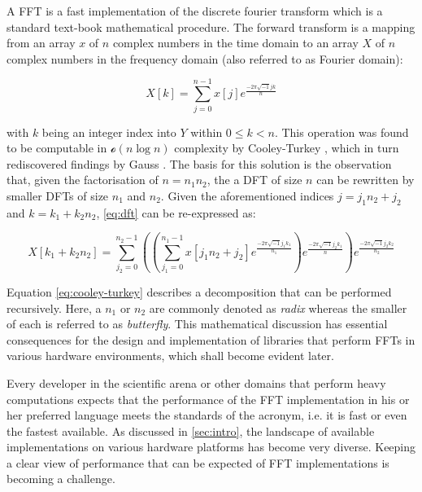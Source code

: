A FFT is a fast implementation of the discrete fourier transform which is a standard text-book mathematical procedure. The forward transform is a mapping from an array $x$ of $n$ complex numbers in the time domain to an array $X$ of $n$ complex numbers in the frequency domain (also referred to as Fourier domain):

\begin{equation}
  \label{eq:dft}
  X[k] = \sum_{j=0}^{n-1} x[j]e^{\frac{-2\pi\sqrt{-1}jk}{n}}
\end{equation}

with $k$ being an integer index into $Y$ within $0 \le k < n$. This operation was found to be computable in $\mathcal{o}(n \log n)$ complexity by Cooley-Turkey \cite{cooley1965algorithm}, which in turn rediscovered findings by Gauss \cite{gauss}. The basis for this solution is the observation that, given the factorisation of $n=n_1n_2$, the a DFT of size $n$ can be rewritten by smaller DFTs of size $n_1$ and $n_2$.  Given the aforementioned indices $j=j_1n_2 + j_2$ and $k=k_1+k_2n_2$, \cref{eq:dft} can be re-expressed as:

\begin{equation}
  \label{eq:cooley-turkey}
  X[k_1 + k_2n_2] = \sum_{j_2=0}^{n_2-1} \left( \left( \sum_{j_1=0}^{n_1-1} x[j_1n_2 + j_2] e^{\frac{-2\pi\sqrt{-1}j_1k_1}{n_1}} \right) e^{\frac{-2\pi\sqrt{-1}j_2k_1}{n}} \right) e^{\frac{-2\pi\sqrt{-1}j_2k_2}{n_2}}
\end{equation}

Equation \cref{eq:cooley-turkey} describes a decomposition that can be performed recursively. Here, a $n_1$ or $n_2$ are commonly denoted as \emph{radix} whereas the smaller of each is referred to as \emph{butterfly}. This mathematical discussion has essential consequences for the design and implementation of libraries that perform FFTs in various hardware environments, which shall become evident later.

Every developer in the scientific arena or other domains that perform heavy computations expects that the performance of the FFT implementation in his or her preferred language meets the standards of the acronym, i.e. it is fast or even the fastest available. As discussed in \cref{sec:intro}, the landscape of available implementations on various hardware platforms has become very diverse. Keeping a clear view of performance that can be expected of FFT implementations is becoming a challenge. 

